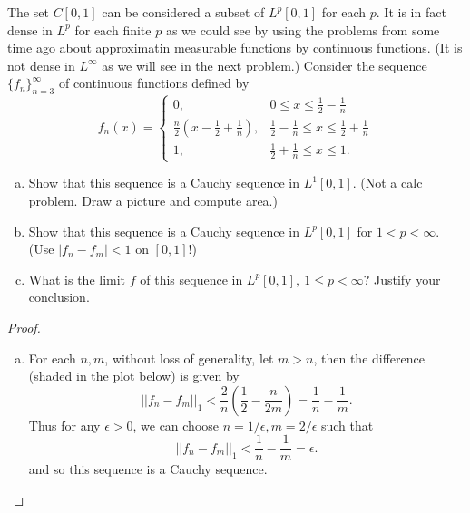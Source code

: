 \begin{pblm}%
	The set $C[0,1]$ can be considered a subset of $L^p[0,1]$ for each $p$. It is in 
	fact dense in $L^p$ for each finite $p$ as we could see by using the problems from 
	some time ago about approximatin measurable functions by continuous functions. (It 
	is not dense in $L^\infty$ as we will see in the next problem.) Consider the sequence 
	$\{f_n\}_{n=3}^\infty$ of continuous functions defined by 
	\begin{equation*}
		f_n(x) = \left\{
		\begin{matrix}
		0, & 0 \le x \le \frac{1}{2} - \frac{1}{n}\\
		\frac{n}{2}\left(x - \frac{1}{2} + \frac{1}{n}\right), & \frac{1}{2} - \frac{1}{n} \le x \le \frac{1}{2} + \frac{1}{n}\\
		1, & \frac{1}{2} + \frac{1}{n} \le x \le 1.
		\end{matrix}
		\right.
	\end{equation*}
	\begin{enumerate}[(a)]
		\item Show that this sequence is a Cauchy sequence in $L^1[0,1]$. (Not a 
			calc problem. Draw a picture and compute area.)
		\item Show that this sequence is a Cauchy sequence in $L^p[0,1]$ for $1 < p < \infty$. 
			(Use $|f_n - f_m| < 1$ on $[0,1]$!)
		\item What is the limit $f$ of this sequence in $L^p[0,1],~1\le p<\infty$? 
			Justify your conclusion. 
	\end{enumerate}
\begin{proof}
	\begin{enumerate}[(a)]
		\item For each $n, m$, without loss of generality, let $m > n$, then 
			the difference (shaded in the plot below) is given by 
			\begin{equation*}||f_n - f_m||_1 < \frac{2}{n}\left(\frac{1}{2} - 
			\frac{n}{2m}\right) = \frac{1}{n} - \frac{1}{m}.\end{equation*}
			Thus for any $\epsilon > 0$, we can choose $n = 1/\epsilon, m = 2/\epsilon$ 
			such that \begin{equation*}||f_n - f_m||_1 < \frac{1}{n} - \frac{1}{m} = \epsilon. \end{equation*}
			and so this sequence is a Cauchy sequence. 
			\begin{center}
			\resizebox{0.38\textwidth}{!}{
			\begin{tikzpicture}
			\begin{axis}[legend pos=north west, legend style={fill=gray!10}, ytick={0, 1},xtick={0,0.5,1}]

\end{axis}
\end{tikzpicture}}
\end{center}
\end{enumerate}
\end{proof}
\end{pblm}
